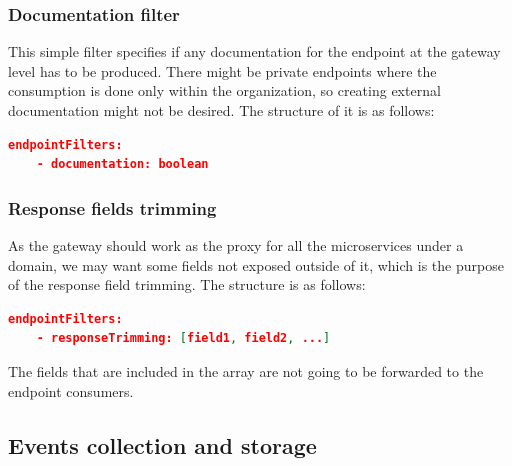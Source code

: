\documentclass[english, 12pt, a4paper, sci, utf8, a-1b, online]{aaltothesis}
\begin{document}
\subsubsection*{Documentation filter}

This simple filter specifies if any documentation for the endpoint at the gateway level has to be produced. There might be private endpoints where the consumption is done only within the organization, so creating external documentation might not be desired. The structure of it is as follows:\\

\begin{lstlisting}[language=json,firstnumber=1]
  endpointFilters:
    - documentation: boolean
\end{lstlisting}

\subsubsection*{Response fields trimming}

As the gateway should work as the proxy for all the microservices under a domain, we may want some fields not exposed outside of it, which is the purpose of the response field trimming. The structure is as follows:\\

\begin{lstlisting}[language=json,firstnumber=1]
  endpointFilters:
    - responseTrimming: [field1, field2, ...]
\end{lstlisting}

The fields that are included in the array are not going to be forwarded to the endpoint consumers.


\subsection{Events collection and storage}


\end{document}
